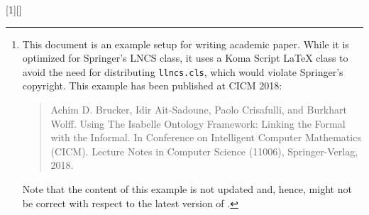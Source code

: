 \usepackage[scaled=0.88]{beramono}
\usepackage{upquote}
\usepackage{textcomp}
\usepackage{xcolor}
\usepackage{paralist}
\usepackage{listings}
\usepackage{lstisadof}
\usepackage{xspace}
\usepackage[draft]{fixme}

%

[1][]{\lstset{style=displaybash, #1}}{}
\def\inlinebash{\lstinline[style=bash, breaklines=true,columns=fullflexible]}

\usepackage[caption]{subfig}
\usepackage[size=footnotesize]{caption}

\newcommand{\ie}{i.e.}
\newcommand{\eg}{e.g.}


\subject{Example of an Academic Paper\footnote{%
  This document is an example setup for writing academic paper. While
  it is optimized for Springer's LNCS class, it uses a Koma Script
  LaTeX class to avoid the need for distributing \texttt{llncs.cls},
  which would violate Springer's copyright. This example has been
  published at CICM 2018:
    \protect\begin{quote}
      Achim D. Brucker, Idir Ait-Sadoune, Paolo Crisafulli, and
      Burkhart Wolff. Using The Isabelle Ontology Framework: Linking
      the Formal with the Informal. In Conference on Intelligent
      Computer Mathematics (CICM). Lecture Notes in Computer Science
      (11006), Springer-Verlag, 2018. 
    \protect\end{quote}
    Note that the content of this example is not updated and, hence,
    might not be correct with respect to the latest version of
    \isadof{}. 
    }}

